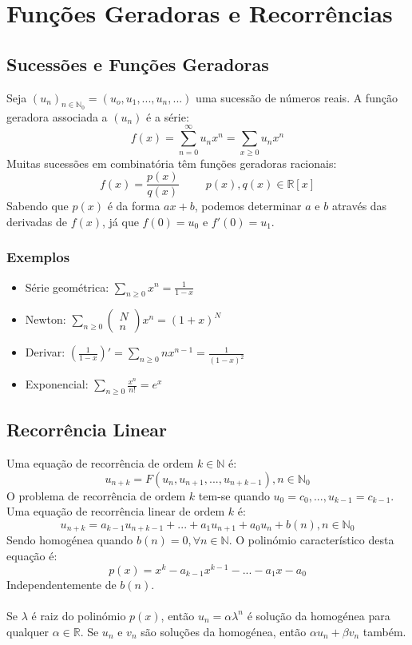 \documentclass[10pt,a4paper]{report}
\begin{document}
\section{Funções Geradoras e Recorrências}
\subsection{Sucessões e Funções Geradoras}
Seja $(u_n)_{n \in \mathbb{N}_0}  = (u_o, u_1, ..., u_n, ...)$ uma sucessão de números reais. A função geradora associada a $(u_n)$ é a série:
$$
f(x) = \sum_{n = 0}^{\infty} u_nx^n = \sum_{x \geq 0} u_nx^n
$$
Muitas sucessões em combinatória têm funções geradoras racionais:
$$
f(x) = \frac{p(x)}{q(x)} \hspace{1cm} p(x), q(x) \in \mathbb{R}[x]
$$
Sabendo que $p(x)$ é da forma $ax+b$, podemos determinar $a$ e $b$ através das derivadas de $f(x)$, já que $f(0) = u_0$ e $f'(0) = u_1$.
\subsubsection{Exemplos}
\begin{itemize}
\item Série geométrica: $\sum_{n \geq 0} x^n = \frac{1}{1-x}$
\item Newton: $\sum_{n \geq 0} \begin{pmatrix}
N\\
n
\end{pmatrix} x^n = (1+x)^N$
\item Derivar: $\left(\frac{1}{1-x}\right)' = \sum_{n \geq 0} nx^{n-1} = \frac{1}{(1-x)^2}$
\item Exponencial: $\sum_{n \geq 0} \frac{x^n}{n!} = e^x$
\end{itemize}
\subsection{Recorrência Linear}
Uma equação de recorrência de ordem $k \in \mathbb{N}$ é:
$$
u_{n+k} = F(u_n, u_{n+1}, ..., u_{n+k-1}), n \in \mathbb{N}_0
$$
O problema de recorrência de ordem $k$ tem-se quando $u_0 = c_0, ..., u_{k-1} = c_{k-1}$. Uma equação de recorrência linear de ordem $k$ é:
$$
u_{n+k} = a_{k-1}u_{n+k-1} + ... + a_1u_{n+1} + a_0u_n + b(n), n \in \mathbb{N}_0
$$
Sendo homogénea quando $b(n) = 0,  \forall n \in \mathbb{N}$. O polinómio característico desta equação é:
$$
p(x) = x^k - a_{k-1}x^{k-1} - ... - a_1x - a_0
$$
Independentemente de $b(n)$.\\
\\
Se $\lambda$ é raiz do polinómio $p(x)$, então $u_n = \alpha \lambda^n$ é solução da homogénea para qualquer $\alpha \in \mathbb{R}$. Se $u_n$ e $v_n$ são soluções da homogénea, então $\alpha u_n + \beta v_n$ também.
\end{document}
